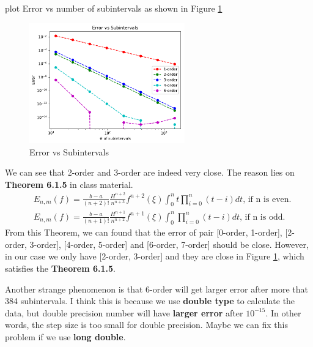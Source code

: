 \documentclass{article}
\begin{document}
plot Error vs number of subintervals as shown in Figure \ref{fig:error_int}
\begin{figure}[H]
    \centering
    \includegraphics[width=0.6\textwidth]{src/error2.pdf}
    \caption{Error vs Subintervals}
    \label{fig:error_int}
\end{figure}
We can see that 2-order and 3-order are indeed very close. The reason lies on \textbf{Theorem 6.1.5} in class material.
\begin{align}
    & E_{n, m}(f) = \frac{b-a}{(n+2)!}\frac{H^{n+2}}{n^{n+3}}f^{n+2}(\xi)\int_0^nt\prod_{i=0}^n(t-i)dt\text{, if n is even}. \\
    & E_{n, m}(f) = \frac{b-a}{(n+1)!}\frac{H^{n+1}}{n^{n+2}}f^{n+1}(\xi)\int_0^n\prod_{i=0}^n(t-i)dt\text{, if n is odd}.
\end{align}
From this Theorem, we can found that the error of pair [0-order, 1-order], [2-order, 3-order], [4-order, 5-order] 
and [6-order, 7-order] should be close. However, in our case we only have [2-order, 3-order] and they are close in Figure \ref{fig:error_int},
which satisfies the \textbf{Theorem 6.1.5}.

Another strange phenomenon is that 6-order will get larger error after more that 384 subintervals. I think this is because we use 
\textbf{double type} to calculate the data, but double precision number will have \textbf{larger error} after $10^{-15}$. In other words,
the step size is too small for double precision. Maybe we can fix this problem if we use \textbf{long double}.
\end{document}
